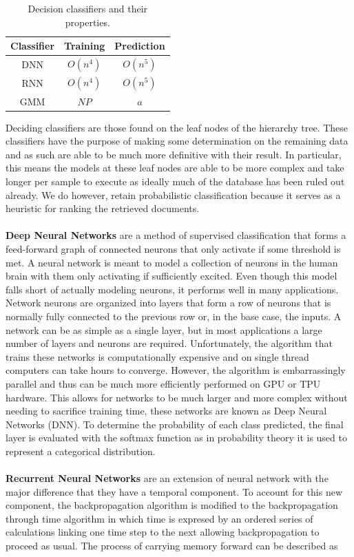 \begin{table}[h]
    \begin{tabular}{c|cc}
        Classifier & Training & Prediction \\ \hline
        DNN & $O(n^4)$ & $O(n^5)$ \\
        RNN & $O(n^4)$ & $O(n^5)$ \\
        GMM & $NP$ & $a$
    \end{tabular}
    \caption{Decision classifiers and their properties.}
    \label{tab:dec-class}
\end{table}
Deciding classifiers are those found on the leaf nodes of the hierarchy tree. These classifiers have the purpose of making some determination on the remaining data and as such are able to be much more definitive with their result. In particular, this means the models at these leaf nodes are able to be more complex and take longer per sample to execute as ideally much of the database has been ruled out already. We do however, retain probabilistic classification because it serves as a heuristic for ranking the retrieved documents.
\\
\\
\textbf{Deep Neural Networks} are a method of supervised classification that forms a feed-forward graph of connected neurons that only activate if some threshold is met. A neural network is meant to model a collection of neurons in the human brain with them only activating if sufficiently excited. Even though this model falls short of actually modeling neurons, it performs well in many applications. Network neurons are organized into layers that form a row of neurons that is normally fully connected to the previous row or, in the base case, the inputs. A network can be as simple as a single layer, but in most applications a large number of layers and neurons are required. Unfortunately, the algorithm that trains these networks is computationally expensive and on single thread computers can take hours to converge. However, the algorithm is embarrassingly parallel and thus can be much more efficiently performed on GPU or TPU hardware. This allows for networks to be much larger and more complex without needing to sacrifice training time, these networks are known as Deep Neural Networks (DNN). To determine the probability of each class predicted, the final layer is evaluated with the softmax function as in probability theory it is used to represent a categorical distribution.
\\
\\
\textbf{Recurrent Neural Networks} are an extension of neural network with the major difference that they have a temporal component. To account for this new component, the backpropagation algorithm is modified to the backpropagation through time algorithm in which time is expresed by an ordered series of calculations linking one time step to the next allowing backpropagation to proceed as usual. The process of carrying memory forward can be described as

